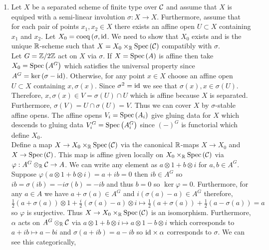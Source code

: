 \documentclass[12pt]{article}
\begin{document}
\begin{enumerate}
\item Let $X$ be a separated scheme of finite type over $\mathcal{C}$ and assume that $X$ is equiped with a semi-linear involution $\sigma : X \to X$. Furthermore, assume that for each pair of points $x_1, x_2 \in X$ there exists an affine open $U \subset X$ containing $x_1$ and $x_2$. Let $X_0 = \operatorname{\mathrm{coeq}}{(\sigma, \mathrm{id}}$. We need to show that $X_0$ exists and is the unique $\mathbb{R}$-scheme such that $X = X_0 \times_{\mathbb{R}} \mathrm{Spec}\left( \mathcal{C} \right)$ compatibly with $\sigma$.
\bigskip\\
Let $G = \mathbb{Z}/2\mathbb{Z}$ act on $X$ via $\sigma$. If $X = \mathrm{Spec}\left( A \right)$ is affine then take $X_0 = \mathrm{Spec}\left( A^G \right)$ which satisfies the universal property since $A^G = \ker{(\sigma - \mathrm{id})}$. Otherwise, for any point $x \in X$ choose an affine open $U \subset X$ containing $x, \sigma(x)$. Since $\sigma^2 = \mathrm{id}$ we see that $\sigma(x), x \in \sigma(U)$. Therefore, $x, \sigma(x) \in V = \sigma(U) \cap U$ which is affine because $X$ is separated. Furthermore, $\sigma(V) = U \cap \sigma(U) = V$. Thus we can cover $X$ by $\sigma$-stable affine opens. The affine opens $V_i = \mathrm{Spec}\left( A_i \right)$ give gluing data for $X$ which descends to gluing data $V_i^G = \mathrm{Spec}\left( A^G_i \right)$ since $(-)^G$ is functorial which define $X_0$.
\bigskip\\
Define a map $X \to X_0 \times_{\mathbb{R}} \mathrm{Spec}\left( \mathcal{C} \right)$ via the canonical $\mathbb{R}$-maps $X \to X_0$ and $X \to \mathrm{Spec}\left( \mathcal{C} \right)$. This map is affine given locally on $X_0 \times_{\mathbb{R}} \mathrm{Spec}\left( \mathcal{C} \right)$ via $\varphi : A^G \otimes_{\mathbb{R}} \mathcal{C} \to A$. We can write any element as $a \otimes 1 + b \otimes i$ for $a,b \in A^G$. Suppose $\varphi(a \otimes 1 + b \otimes i) = a + i b = 0$ then $i b \in A^G$ so $i b = \sigma(ib) = -i \sigma(b) = -i b$ and thus $b = 0$ so $\ker{\varphi} = 0$. Furthermore, for any $a \in A$ we have $a + \sigma(a) \in A^G$ and $i (\sigma(a) - a)  \in A^G$ therefore,
\[ \tfrac{1}{2} (a + \sigma(a)) \otimes 1 + \tfrac{i}{2} (\sigma(a) - a) \otimes i \mapsto \tfrac{1}{2} (a + \sigma(a)) + \tfrac{1}{2}(a - \sigma(a)) = a \]
so $\varphi$ is surjective. Thus $X \to X_0 \times_{\mathbb{R}} \mathrm{Spec}\left( \mathcal{C} \right)$ is an isomorphism. Furthermore, $\alpha$ acts on $A^G \otimes_{\mathbb{R}} \mathcal{C}$ via $a \otimes 1 + b \otimes i \mapsto a \otimes 1 - b \otimes i$ which corresponds to $a + ib \mapsto a - bi$ and $\sigma(a + ib) = a - ib$ so $\mathrm{id} \times \alpha$ corresponds to $\sigma$. We can see this categorically,
\begin{center}
\end{center}
\end{enumerate}
\end{document}
